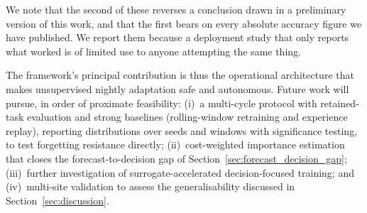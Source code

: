 \documentclass[journal]{IEEEtran}
\begin{document}
We note that the second of these reverses a conclusion drawn in a
preliminary version of this work, and that the first bears on every
absolute accuracy figure we have published. We report them because
a deployment study that only reports what worked is of limited use
to anyone attempting the same thing.

The framework's principal contribution is thus the operational
architecture that makes unsupervised nightly adaptation safe and
autonomous. Future work will pursue, in order of proximate
feasibility: (i)~a multi-cycle protocol with retained-task
evaluation and strong baselines (rolling-window retraining and
experience replay), reporting distributions over seeds and windows
with significance testing, to test forgetting resistance directly;
(ii)~cost-weighted importance estimation that closes the
forecast-to-decision gap of Section~\ref{sec:forecast_decision_gap};
(iii)~further investigation of surrogate-accelerated decision-focused
training; and (iv)~multi-site validation to assess the generalisability
discussed in Section~\ref{sec:discussion}.
\end{document}

